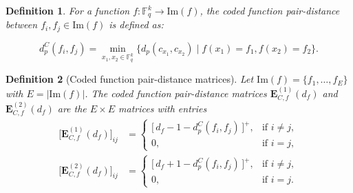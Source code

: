 \documentclass[11pt,draftclsnofoot,journal,onecolumn]{IEEEtran}
\newtheorem{definition}{Definition}
\begin{document}
        \begin{definition}
        \label{def:coded-func-pair-dist}
        For a function $f : \mathbb{F}_q^k \to \text{Im}(f)$, the coded function pair-distance between $f_i, f_j \in \text{Im}(f)$ is defined as:

        $$d_p^{C}(f_i, f_j) = \min_{x_1, x_2 \in \mathbb{F}_q^k} \{d_{p}(c_{x_1}, c_{x_2}) \mid f(x_1) = f_1, f(x_2) = f_2\}.$$
        \end{definition}
    



        
        \begin{definition}[Coded function pair-distance matrices]
        \label{def:coded-func-matrices}
        Let $\mathrm{Im}(f) = \{f_1, \ldots, f_E\}$ with $E = |\mathrm{Im}(f)|$. The
        \emph{coded function pair-distance matrices}
        $\boldsymbol{E}^{(1)}_{C,f}(d_f)$ and $\boldsymbol{E}^{(2)}_{C,f}(d_f)$ are the
        $E \times E$ matrices with entries
        \begin{align*}
        \bigl[\boldsymbol{E}^{(1)}_{C,f}(d_f)\bigr]_{ij}
        &=
        \begin{cases}
            \bigl[\,d_f - 1 - d^{C}_{p}(f_i, f_j)\,\bigr]^{+}, & \text{if } i \neq j,\\[2pt]
            0, & \text{if } i = j,
        \end{cases}
        \\[6pt]
        \bigl[\boldsymbol{E}^{(2)}_{C,f}(d_f)\bigr]_{ij}
        &=
        \begin{cases}
            \bigl[\,d_f + 1 - d^{C}_{p}(f_i, f_j)\,\bigr]^{+}, & \text{if } i \neq j,\\[2pt]
            0, & \text{if } i = j.
        \end{cases}
        \end{align*}
        \end{definition}
\end{document}
